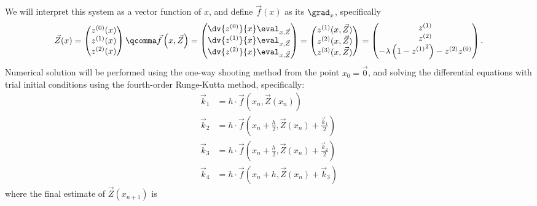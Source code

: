 \begin{example}
	We will interpret this system as a vector function of $x$, and define $\vec{f}(x)$ as its $\grad_x$, specifically
	\begin{equation}
		\vec{Z}(x) =
		\begin{pmatrix}
			z^{(0)}(x) \\
			z^{(1)}(x) \\
			z^{(2)}(x) \\
		\end{pmatrix} \qcomma
		\vec{f}\left(x,\vec{Z}\right) =
		\begin{pmatrix}
			\dv{z^{(0)}}{x}\eval_{x,\vec{Z}} \\
			\dv{z^{(1)}}{x}\eval_{x,\vec{Z}} \\
			\dv{z^{(2)}}{x}\eval_{x,\vec{Z}} \\
		\end{pmatrix}  =
		\begin{pmatrix}
			z^{(1)}(x,\vec{Z}) \\
			z^{(2)}(x,\vec{Z}) \\
			z^{(3)}(x,\vec{Z}) \\
		\end{pmatrix} =
		\begin{pmatrix}
			z^{(1)} \\
			z^{(2)} \\
			-\lambda \left( 1 - {z^{(1)}}^{2} \right)  - z^{(2)}z^{(0)}
		\end{pmatrix}.
	\end{equation}
	Numerical solution will be performed using the one-way shooting method from the point $x_{0} = \vec{0}$, and solving the differential equations with trial initial conditions using the fourth-order Runge-Kutta method, specifically:
	\begin{equation}
		\begin{aligned}
			\vec{k}_{1} & = h \cdot \vec{f}\left(  x_{n}, \vec{Z}(x_{n}) \right)                                      \\
			\vec{k}_{2} & = h \cdot \vec{f}\left(  x_{n} + \frac{h}{2}, \vec{Z}(x_{n}) + \frac{\vec{k}_{1}}{2} \right) \\
			\vec{k}_{3} & = h \cdot \vec{f}\left( x_{n} + \frac{h}{2}, \vec{Z}(x_{n}) + \frac{\vec{k}_{2}}{2}  \right) \\
			\vec{k}_{4} & = h \cdot \vec{f}\left( x_{n} + h, \vec{Z}(x_{n}) + \vec{k}_{3}  \right)
		\end{aligned}
	\end{equation}
	where the final estimate of $\vec{Z}(x_{n+1})$ is
	\begin{equation}

\end{equation}
\end{example}
